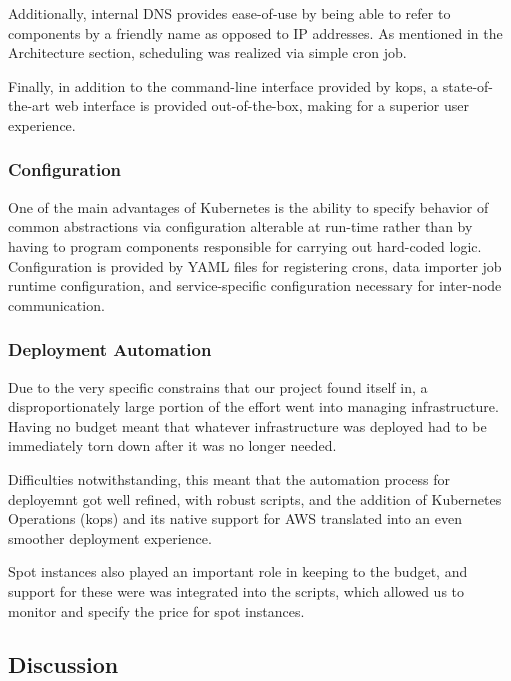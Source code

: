 Additionally, internal DNS provides ease-of-use by being able to refer
to components by a friendly name as opposed to IP addresses. As
mentioned in the Architecture section, scheduling was realized via
simple cron job.

Finally, in addition to the command-line interface provided by kops, a
state-of-the-art web interface is provided out-of-the-box, making for a
superior user experience.

\subsubsection{Configuration}\label{configuration}

One of the main advantages of Kubernetes is the ability to specify
behavior of common abstractions via configuration alterable at run-time
rather than by having to program components responsible for carrying out
hard-coded logic. Configuration is provided by YAML files for
registering crons, data importer job runtime configuration, and
service-specific configuration necessary for inter-node communication.

\subsubsection{Deployment Automation}\label{deployment-automation}

Due to the very specific constrains that our project found itself in, a
disproportionately large portion of the effort went into managing
infrastructure. Having no budget meant that whatever infrastructure was
deployed had to be immediately torn down after it was no longer needed.

Difficulties notwithstanding, this meant that the automation process for
deployemnt got well refined, with robust scripts, and the addition of
Kubernetes Operations (kops) and its native support for AWS translated
into an even smoother deployment experience.

Spot instances also played an important role in keeping to the budget,
and support for these were was integrated into the scripts, which
allowed us to monitor and specify the price for spot instances.

\subsection{Discussion}\label{discussion}
